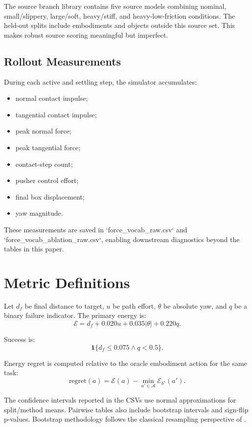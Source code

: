 \documentclass{article}
\newcommand{\energy}{\mathcal{E}}
\newcommand{\actions}{\mathcal{A}}
\begin{document}
The source branch library contains five source models combining nominal, small/slippery, large/soft, heavy/stiff, and heavy-low-friction conditions. The held-out splits include embodiments and objects outside this source set. This makes robust source scoring meaningful but imperfect.

\subsection{Rollout Measurements}

During each active and settling step, the simulator accumulates:

\begin{itemize}
\item normal contact impulse;
\item tangential contact impulse;
\item peak normal force;
\item peak tangential force;
\item contact-step count;
\item pusher control effort;
\item final box displacement;
\item yaw magnitude.
\end{itemize}

These measurements are saved in `force\_vocab\_raw.csv` and `force\_vocab\_ablation\_raw.csv`, enabling downstream diagnostics beyond the tables in this paper.

\section{Metric Definitions}

Let $d_f$ be final distance to target, $u$ be path effort, $\theta$ be absolute yaw, and $q$ be a binary failure indicator. The primary energy is:
\[
\energy=d_f+0.020u+0.035|\theta|+0.220q.
\]

Success is:
\[
  \mathbf{1}\{d_f \leq 0.075 \wedge q < 0.5\}.
\]

Energy regret is computed relative to the oracle embodiment action for the same task:
\[
  \mathrm{regret}(a)=\energy(a)-\min_{a'\in\actions}\energy_{b^\star}(a').
\]

The confidence intervals reported in the CSVs use normal approximations for split/method means. Pairwise tables also include bootstrap intervals and sign-flip p-values. Bootstrap methodology follows the classical resampling perspective of \citet{efron1979bootstrap}.
\end{document}
